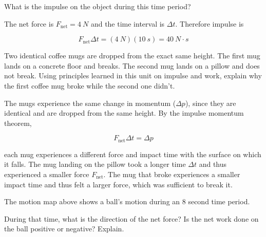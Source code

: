 \documentclass[]{exam}
\newif\ifversionKlevel
\begin{document}
\begin{questions}
What is the impulse on the object during this time period?

\begin{solutionorbox}[4cm]
The net force is $F_\text{net} = \SI{4}{N}$ and the time interval is $\Delta t$. Therefore impulse is


\begin{equation*}
    F_\mathrm{net} \Delta t = (\SI{4}{N})(\SI{10}{s}) = \boxed{\SI{40}{N \cdot s}}
\end{equation*}

\end{solutionorbox}

\question
Two identical coffee mugs are dropped from the exact same height. The first mug lands on a concrete floor and breaks. The second mug lands on a pillow and does not break. Using principles learned in this unit on impulse and work, explain why the first coffee mug broke while the second one didn't.

\begin{solution}
    The mugs experience the same change in momentum ($\Delta p$), since they are identical and are dropped from the same height. By the impulse momentum theorem,

    \begin{equation*}
        F_{\mathrm{net}} \Delta t = \Delta p
    \end{equation*}

    each mug experiences a different force and impact time with the surface on which it falls. The mug landing on the pillow took a longer time $\Delta t$ and thus experienced a smaller force $F_\text{net}$. The mug that broke experiences a smaller impact time and thus felt a larger force, which was sufficient to break it.
\end{solution}

\ifprintanswers
\else
\fillwithlines{3cm}
\fi


\ifversionKlevel
\else
\question
The motion map above shows a ball's motion during an 8 second time period. 

\begin{center}
\end{center}

During that time, what is the direction of the net force? Is the net work done on the ball positive or negative? Explain.


\end{questions}
\end{document}
